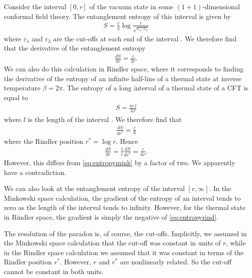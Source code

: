 \documentclass[12pt]{article}
\begin{document}
Consider the interval $[0,r]$ of the vacuum state in some $(1+1)$-dimensional conformal field theory. The entanglement entropy of this interval is given by
\begin{align} \label{eq:cutoffsrindler}
S = \frac{c}{3} \log \frac{r}{\sqrt{\varepsilon_1, \varepsilon_2}}
\end{align}
where $\varepsilon_1$ and $\varepsilon_2$ are the cut-offs at each end of the interval \cite{calabrese2004entanglement, calabrese2009entanglement}. We therefore find that the derivative of the entanglement entropy
\begin{align} \label{eq:entropymink}
\frac{d S}{d r} = \frac{c}{3 r}.
\end{align}
We can also do this calculation in Rindler space, where it corresponds to finding the derivative of the entropy of an infinite half-line of a thermal state at inverse temperature $\beta = 2 \pi$. The entropy of a long interval of a thermal state of a CFT is equal to
\begin{align}
S = \frac{\pi c\, l}{3 \beta}
\end{align}
where $l$ is the length of the interval \cite{calabrese2004entanglement, calabrese2009entanglement}. We therefore find that
\begin{align}
\frac{d S}{d r^{*}} = \frac{c}{6}
\end{align}
where the Rindler position $r^* = \log r$. Hence
\begin{align} \label{eq:entropyrind}
\frac{d S}{d r} = \frac{1}{r} \frac{d S}{d r^*} = \frac{c}{6 r}.
\end{align}
However, this differs from \eqref{eq:entropymink} by a factor of two. We apparently have a contradiction. 

We can also look at the entanglement entropy of the interval $[r,\infty]$. In the Minkowski space calculation, the gradient of the entropy of an interval tends to zero as the length of the interval tends to infinity. However, for the thermal state in Rindler space, the gradient is simply the negative of \eqref{eq:entropyrind}.

The resolution of the paradox is, of course, the cut-offs. Implicitly, we assumed in the Minkowski space calculation that the cut-off was constant in units of $r$, while in the Rindler space calculation we assumed that it was constant in terms of the Rindler position $r^*$. However, $r$ and $r^*$ are nonlinearly related. So the cut-off cannot be constant in both units.
\end{document}
